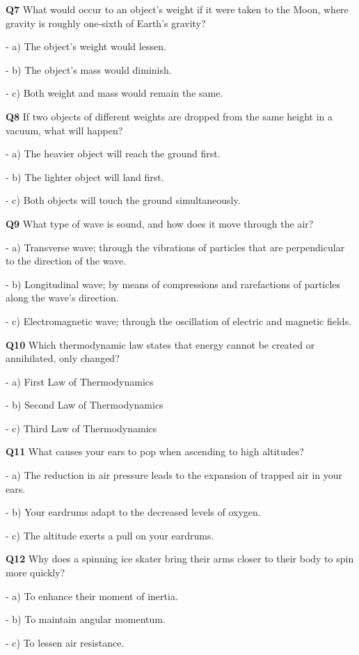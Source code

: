 \textbf{Q7} What would occur to an object's weight if it were taken to the Moon, where gravity is roughly one‑sixth of Earth's gravity?\par
\quad - a) The object's weight would lessen.\par
\quad - b) The object's mass would diminish.\par
\quad - c) Both weight and mass would remain the same.\par

\textbf{Q8} If two objects of different weights are dropped from the same height in a vacuum, what will happen?\par
\quad - a) The heavier object will reach the ground first.\par
\quad - b) The lighter object will land first.\par
\quad - c) Both objects will touch the ground simultaneously.\par

\textbf{Q9} What type of wave is sound, and how does it move through the air?\par
\quad - a) Transverse wave; through the vibrations of particles that are perpendicular to the direction of the wave.\par
\quad - b) Longitudinal wave; by means of compressions and rarefactions of particles along the wave's direction.\par
\quad - c) Electromagnetic wave; through the oscillation of electric and magnetic fields.\par

\textbf{Q10} Which thermodynamic law states that energy cannot be created or annihilated, only changed?\par
\quad - a) First Law of Thermodynamics\par
\quad - b) Second Law of Thermodynamics\par
\quad - c) Third Law of Thermodynamics\par

\textbf{Q11} What causes your ears to pop when ascending to high altitudes?\par
\quad - a) The reduction in air pressure leads to the expansion of trapped air in your ears.\par
\quad - b) Your eardrums adapt to the decreased levels of oxygen.\par
\quad - c) The altitude exerts a pull on your eardrums.\par

\textbf{Q12} Why does a spinning ice skater bring their arms closer to their body to spin more quickly?\par
\quad - a) To enhance their moment of inertia.\par
\quad - b) To maintain angular momentum.\par
\quad - c) To lessen air resistance.\par


